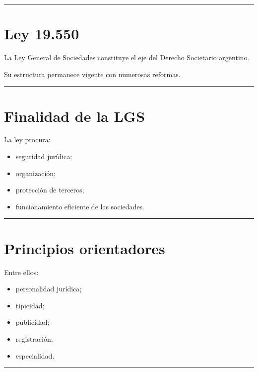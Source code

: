 \documentclass[
  spanish,
  letterpaper,
  DIV=11,
  numbers=noendperiod]{scrartcl}
\providecommand{\tightlist}{%
  \setlength{\itemsep}{0pt}\setlength{\parskip}{0pt}}
\begin{document}
\begin{center}\rule{0.5\linewidth}{0.5pt}\end{center}

\section{Ley 19.550}\label{ley-19.550}

La Ley General de Sociedades constituye el eje del Derecho Societario
argentino.

Su estructura permanece vigente con numerosas reformas.

\begin{center}\rule{0.5\linewidth}{0.5pt}\end{center}

\section{Finalidad de la LGS}\label{finalidad-de-la-lgs}

La ley procura:

\begin{itemize}
\tightlist
\item
  seguridad jurídica;
\item
  organización;
\item
  protección de terceros;
\item
  funcionamiento eficiente de las sociedades.
\end{itemize}

\begin{center}\rule{0.5\linewidth}{0.5pt}\end{center}

\section{Principios orientadores}\label{principios-orientadores}

Entre ellos:

\begin{itemize}
\tightlist
\item
  personalidad jurídica;
\item
  tipicidad;
\item
  publicidad;
\item
  registración;
\item
  especialidad.
\end{itemize}

\begin{center}\rule{0.5\linewidth}{0.5pt}\end{center}
\end{document}
